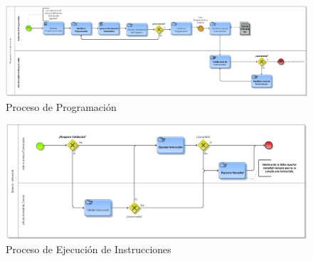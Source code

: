 \documentclass[oneside,12pt, letterpaper, titlepage]{book}
\begin{document}
\begin{appendices}
\begin{figure}[H]
    \centering
    \includegraphics[scale=0.3]{./images/Modelo_Generar_Programacion}
    \caption{Proceso de Programación}
    \label{fig:MGP}
\end{figure}

\begin{figure}[H]
    \centering
    \includegraphics[scale=0.4]{./images/Modelo_Ejecutar_Instruccion}
    \caption{Proceso de Ejecución de Instrucciones}
    \label{fig:MEI}
\end{figure}

\newpage

\end{appendices}
\end{document}

